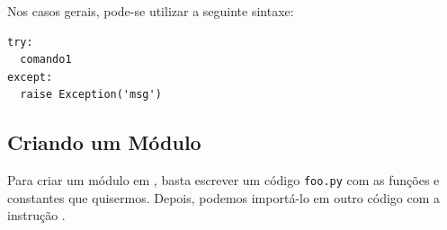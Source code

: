 \begin{obs}
  Nos casos gerais, pode-se utilizar a seguinte sintaxe:

\begin{lstlisting}
try:
  comando1
except:
  raise Exception('msg')
\end{lstlisting}

\end{obs}

\subsection{Criando um Módulo}

Para criar um módulo em {\python}, basta escrever um código \lstinline+foo.py+ com as funções e constantes que quisermos. Depois, podemos importá-lo em outro código com a instrução {\PYTHONimport}.

